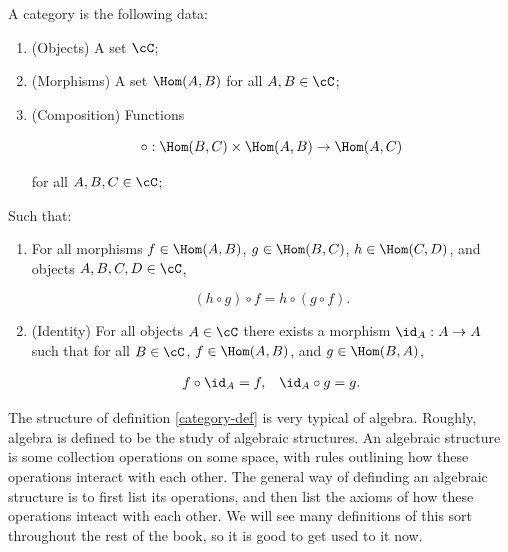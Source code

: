 \begin{defn}[Category]\label{category-def} A category is the following data:

\begin{enumerate}
\item (Objects) A set $\cC$;
\item (Morphisms) A set $\Hom(A,B)$ for all $A,B\in \cC$;
\item (Composition) Functions

$$\circ: \Hom(B,C)\times \Hom(A,B)\to \Hom(A,C)$$

for all $A,B,C\in \cC$;
\end{enumerate}

Such that:

\begin{enumerate}

\item  For all morphisms $f\in \Hom(A,B)$, $g\in \Hom(B,C)$, $h\in\Hom(C,D)$,  and objects $A,B,C,D\in \cC$,

$$(h\circ g)\circ f = h\circ (g\circ f).$$

\item (Identity) For all objects $A\in \cC$ there exists a morphism $\id_{A}: A\to A$ such that for all $B\in \cC$, $f\in \Hom(A,B)$, and $g\in \Hom(B,A)$,

\begin{align*}
f\circ \id_{A}=f, && \id_{A}\circ g = g.
\end{align*}

\end{enumerate}
\end{defn}

\begin{rem} The structure of definition \ref{category-def} is very typical of algebra. Roughly, algebra is defined to be the study of algebraic structures. An algebraic structure is some collection operations on some space, with rules outlining how these operations interact with each other. The general way of definding an algebraic structure is to first list its operations, and then list the axioms of how these operations inteact with each other. We will see many definitions of this sort throughout the rest of the book, so it is good to get used to it now.
\end{rem}

